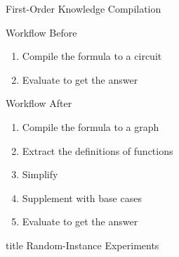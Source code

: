 \documentclass{beamer}
\begin{document}
\begin{frame}{First-Order Knowledge Compilation}
  \begin{block}{Workflow Before}
    \begin{enumerate}
      \item Compile the formula to a \alert{circuit}
      \item Evaluate to get the answer
    \end{enumerate}
  \end{block}
  \begin{block}{Workflow After}
    \begin{enumerate}
      \item Compile the formula to a \alert{graph}
      \item Extract the definitions of functions
      \item Simplify
      \item Supplement with \alert{base cases}
      \item Evaluate to get the answer
    \end{enumerate}
  \end{block}
\end{frame}

\begin{frame}
  \vfill
  \centering
  \begin{beamercolorbox}[sep=8pt,center,shadow=true,rounded=true]{title}
    Random-Instance Experiments\par%
  \end{beamercolorbox}
  \vfill
\end{frame}
\end{document}
